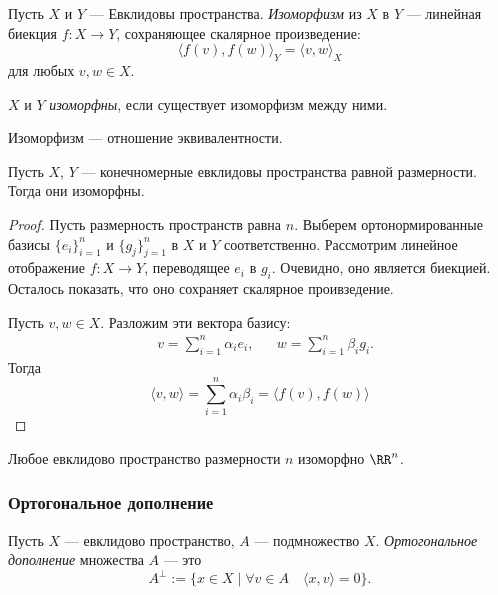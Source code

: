 \documentclass[12pt,a4paper]{article}
\begin{document}
    \begin{definition}
        Пусть $X$ и $Y$ --- Евклидовы пространства. \emph{Изоморфизм} из $X$ в $Y$ --- линейная биекция $f: X \to Y$, сохраняющее скалярное произведение:
        \[\langle f(v), f(w) \rangle_Y = \langle v, w \rangle_X\]
        для любых $v, w \in X$.

        $X$ и $Y$ \emph{изоморфны}, если существует изоморфизм между ними.
    \end{definition}

    \begin{remark}
        Изоморфизм --- отношение эквивалентности.
    \end{remark}

    \begin{theorem}
        Пусть $X$, $Y$ --- конечномерные евклидовы пространства равной размерности. Тогда они изоморфны.
    \end{theorem}

    \begin{proof}
        Пусть размерность пространств равна $n$. Выберем ортонормированные базисы $\{e_i\}_{i=1}^n$ и $\{g_j\}_{j=1}^n$ в $X$ и $Y$ соответственно. Рассмотрим линейное отображение $f: X \to Y$, переводящее $e_i$ в $g_i$. Очевидно, оно является биекцией. Осталось показать, что оно сохраняет скалярное проивзедение.

        Пусть $v, w \in X$. Разложим эти вектора базису:
        \begin{align*}
            &v = \sum_{i=1}^n \alpha_i e_i,&
            &w = \sum_{i=1}^n \beta_i g_i.
        \end{align*}
        Тогда
        \[
            \langle v, w \rangle
            = \sum_{i=1}^n \alpha_i \beta_i
            = \langle f(v), f(w) \rangle
        \]
    \end{proof}

    \begin{corollary}
        Любое евклидово пространство размерности $n$ изоморфно $\RR^n$.
    \end{corollary}

    \subsubsection{Ортогональное дополнение}

    \begin{definition}
        Пусть $X$ --- евклидово пространство, $A$ --- подмножество $X$. \emph{Ортогональное дополнение} множества $A$ --- это
        \[A^\perp := \{x \in X \mid \forall v \in A\quad \langle x, v \rangle = 0 \}.\]
    \end{definition}
\end{document}
